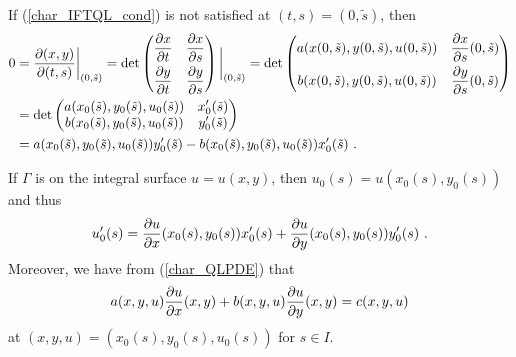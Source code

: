 \begin{rmk}
If (\ref{char_IFTQL_cond}) is not satisfied at $(t,s) = (0,\tilde{s})$, then
\begin{align}
0 &= \frac{\partial(x,y)}{\partial(t,s)}\bigg|_{(0,\tilde{s})}
= \det \begin{pmatrix}
\displaystyle \frac{\partial{x}}{\partial t} & \displaystyle \frac{\partial{x}}{\partial s} \\[0.7em]
\displaystyle \frac{\partial{y}}{\partial t} & \displaystyle \frac{\partial{y}}{\partial s}
\end{pmatrix}\bigg|_{(0,\tilde{s})}
= \det \begin{pmatrix}
a(x(0,\tilde{s}), y(0,\tilde{s}), u(0,\tilde{s}))
& \displaystyle \frac{\partial{x}}{\partial s}(0,\tilde{s}) \\[0.7em]
b(x(0,\tilde{s}), y(0,\tilde{s}), u(0,\tilde{s}))
& \displaystyle \frac{\partial{y}}{\partial s}(0,\tilde{s})
\end{pmatrix} \nonumber \\
&= \det \begin{pmatrix}
a(x_0(\tilde{s}), y_0(\tilde{s}), u_0(\tilde{s}))
& \displaystyle x_0'(\tilde{s}) \\
b(x_0(\tilde{s}), y_0(\tilde{s}), u_0(\tilde{s}))
& \displaystyle y_0'(\tilde{s})
\end{pmatrix} \nonumber \\
&= a(x_0(\tilde{s}), y_0(\tilde{s}), u_0(\tilde{s}))y_0'(\tilde{s})
- b(x_0(\tilde{s}), y_0(\tilde{s}),u_0(\tilde{s})) x_0'(\tilde{s})
\ . \label{char_idt1}
\end{align}

If $\Gamma$ is on the integral surface $u=u(x,y)$, then
$u_0(s) = u(x_0(s), y_0(s))$ and thus
\begin{equation} \label{char_idt2}
u_0'(s) = \frac{\partial{u}}{\partial x}(x_0(s), y_0(s))x_0'(s)
+\frac{\partial{u}}{\partial y}(x_0(s), y_0(s))y_0'(s) \ .
\end{equation}
Moreover, we have from (\ref{char_QLPDE}) that
\begin{equation} \label{char_idt3}
a(x, y, u)\frac{\partial{u}}{\partial x}(x, y) + b(x, y, u)\frac{\partial{u}}{\partial y}(x, y)
= c(x, y, u)
\end{equation}
at $(x,y,u)= (x_0(s), y_0(s), u_0(s))$ for $s \in I$.


\end{rmk}
